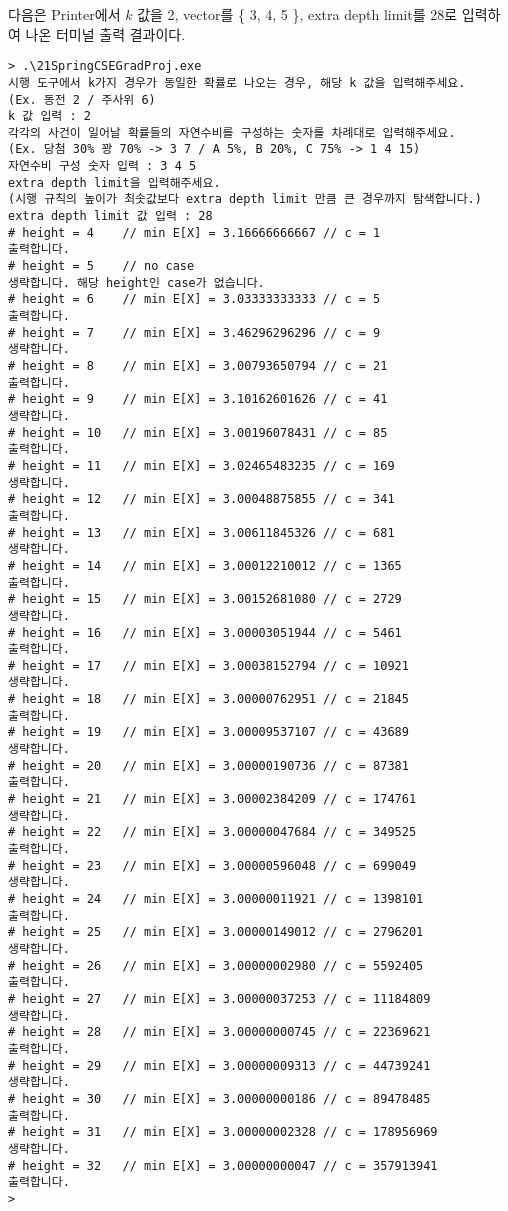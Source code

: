 \documentclass[11pt]{article}
\begin{document}
다음은 Printer에서 $k$ 값을 2, vector를 \{ 3, 4, 5 \}, extra depth limit를 28로 입력하여 나온 터미널 출력 결과이다.

\singlespacing
\begin{verbatim}
> .\21SpringCSEGradProj.exe
시행 도구에서 k가지 경우가 동일한 확률로 나오는 경우, 해당 k 값을 입력해주세요.
(Ex. 동전 2 / 주사위 6)
k 값 입력 : 2
각각의 사건이 일어날 확률들의 자연수비를 구성하는 숫자를 차례대로 입력해주세요.
(Ex. 당첨 30% 꽝 70% -> 3 7 / A 5%, B 20%, C 75% -> 1 4 15)
자연수비 구성 숫자 입력 : 3 4 5
extra depth limit을 입력해주세요.
(시행 규칙의 높이가 최솟값보다 extra depth limit 만큼 큰 경우까지 탐색합니다.)
extra depth limit 값 입력 : 28
# height = 4    // min E[X] = 3.16666666667 // c = 1
출력합니다.
# height = 5    // no case
생략합니다. 해당 height인 case가 없습니다.
# height = 6    // min E[X] = 3.03333333333 // c = 5
출력합니다.
# height = 7    // min E[X] = 3.46296296296 // c = 9
생략합니다.
# height = 8    // min E[X] = 3.00793650794 // c = 21
출력합니다.
# height = 9    // min E[X] = 3.10162601626 // c = 41
생략합니다.
# height = 10   // min E[X] = 3.00196078431 // c = 85
출력합니다.
# height = 11   // min E[X] = 3.02465483235 // c = 169
생략합니다.
# height = 12   // min E[X] = 3.00048875855 // c = 341
출력합니다.
# height = 13   // min E[X] = 3.00611845326 // c = 681
생략합니다.
# height = 14   // min E[X] = 3.00012210012 // c = 1365
출력합니다.
# height = 15   // min E[X] = 3.00152681080 // c = 2729
생략합니다.
# height = 16   // min E[X] = 3.00003051944 // c = 5461
출력합니다.
# height = 17   // min E[X] = 3.00038152794 // c = 10921
생략합니다.
# height = 18   // min E[X] = 3.00000762951 // c = 21845
출력합니다.
# height = 19   // min E[X] = 3.00009537107 // c = 43689
생략합니다.
# height = 20   // min E[X] = 3.00000190736 // c = 87381
출력합니다.
# height = 21   // min E[X] = 3.00002384209 // c = 174761
생략합니다.
# height = 22   // min E[X] = 3.00000047684 // c = 349525
출력합니다.
# height = 23   // min E[X] = 3.00000596048 // c = 699049
생략합니다.
# height = 24   // min E[X] = 3.00000011921 // c = 1398101
출력합니다.
# height = 25   // min E[X] = 3.00000149012 // c = 2796201
생략합니다.
# height = 26   // min E[X] = 3.00000002980 // c = 5592405
출력합니다.
# height = 27   // min E[X] = 3.00000037253 // c = 11184809
생략합니다.
# height = 28   // min E[X] = 3.00000000745 // c = 22369621
출력합니다.
# height = 29   // min E[X] = 3.00000009313 // c = 44739241
생략합니다.
# height = 30   // min E[X] = 3.00000000186 // c = 89478485
출력합니다.
# height = 31   // min E[X] = 3.00000002328 // c = 178956969
생략합니다.
# height = 32   // min E[X] = 3.00000000047 // c = 357913941
출력합니다.
>
\end{verbatim}
\doublespacing
\end{document}
